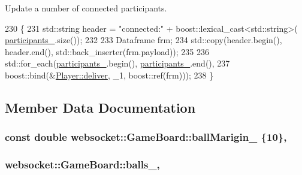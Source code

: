 Update a number of connected participants. 


\begin{DoxyCode}
230     \{
231         std::string header = \textcolor{stringliteral}{"connected:"} + boost::lexical\_cast<std::string>(
      \hyperlink{classwebsocket_1_1GameBoard_a49ad7c4c31e144021a4c7e12c73d0433}{participants\_}.size());
232 
233         Dataframe frm;
234         std::copy(header.begin(), header.end(), std::back\_inserter(frm.payload));
235 
236         std::for\_each(\hyperlink{classwebsocket_1_1GameBoard_a49ad7c4c31e144021a4c7e12c73d0433}{participants\_}.begin(), \hyperlink{classwebsocket_1_1GameBoard_a49ad7c4c31e144021a4c7e12c73d0433}{participants\_}.end(),
237             boost::bind(&\hyperlink{classwebsocket_1_1Player_adf19a07c6497129268b3719783e7180d}{Player::deliver}, \_1, boost::ref(frm)));
238     \}
\end{DoxyCode}


\subsection{Member Data Documentation}
\subsubsection[{\texorpdfstring{ball\+Marigin\+\_\+}{ballMarigin_}}]{\setlength{\rightskip}{0pt plus 5cm}const double websocket\+::\+Game\+Board\+::ball\+Marigin\+\_\+ \{10\}\hspace{0.3cm}{\ttfamily [static]}, {\ttfamily [private]}}\hypertarget{classwebsocket_1_1GameBoard_add182baa81ccbe72610eebacdb0b8dd6}{}\label{classwebsocket_1_1GameBoard_add182baa81ccbe72610eebacdb0b8dd6}
\subsubsection[{\texorpdfstring{balls\+\_\+}{balls_}}]{ websocket\+::\+Game\+Board\+::balls\+\_\+\hspace{0.3cm}{\ttfamily [static]}, {\ttfamily [private]}}\hypertarget{classwebsocket_1_1GameBoard_a8bdb65edb9742890aa150d5c7c5b7209}{}\label{classwebsocket_1_1GameBoard_a8bdb65edb9742890aa150d5c7c5b7209}
